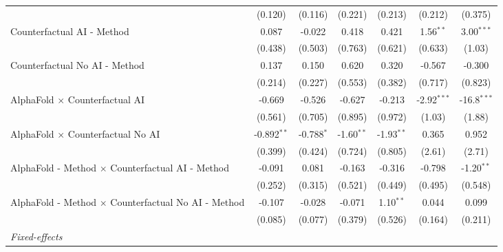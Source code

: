 \begin{tabular}{lcccccc}
                                                              & (0.120)       & (0.116)       & (0.221)      & (0.213)      & (0.212)       & (0.375)\\   
   Counterfactual AI - Method                                 & 0.087         & -0.022        & 0.418        & 0.421        & 1.56$^{**}$   & 3.00$^{***}$\\   
                                                              & (0.438)       & (0.503)       & (0.763)      & (0.621)      & (0.633)       & (1.03)\\   
   Counterfactual No AI - Method                              & 0.137         & 0.150         & 0.620        & 0.320        & -0.567        & -0.300\\   
                                                              & (0.214)       & (0.227)       & (0.553)      & (0.382)      & (0.717)       & (0.823)\\   
   AlphaFold $\times$ Counterfactual AI                       & -0.669        & -0.526        & -0.627       & -0.213       & -2.92$^{***}$ & -16.8$^{***}$\\   
                                                              & (0.561)       & (0.705)       & (0.895)      & (0.972)      & (1.03)        & (1.88)\\   
   AlphaFold $\times$ Counterfactual No AI                    & -0.892$^{**}$ & -0.788$^{*}$  & -1.60$^{**}$ & -1.93$^{**}$ & 0.365         & 0.952\\   
                                                              & (0.399)       & (0.424)       & (0.724)      & (0.805)      & (2.61)        & (2.71)\\   
   AlphaFold - Method $\times$ Counterfactual AI - Method     & -0.091        & 0.081         & -0.163       & -0.316       & -0.798        & -1.20$^{**}$\\   
                                                              & (0.252)       & (0.315)       & (0.521)      & (0.449)      & (0.495)       & (0.548)\\   
   AlphaFold - Method $\times$ Counterfactual No AI - Method  & -0.107        & -0.028        & -0.071       & 1.10$^{**}$  & 0.044         & 0.099\\   
                                                              & (0.085)       & (0.077)       & (0.379)      & (0.526)      & (0.164)       & (0.211)\\   
   \midrule
   \emph{Fixed-effects}\\

\end{tabular}
